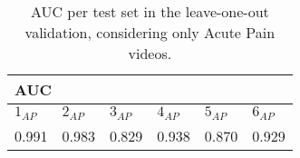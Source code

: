 \begin{table}[h!tp]
\centering
\caption{AUC per test set in the leave-one-out validation, considering only Acute Pain videos.}
\label{tab:auc_leave_one_out}
\begin{tabular}{llllll}
\hline
\multicolumn{6}{l}{AUC} \\ \hline
\multicolumn{1}{l|}{$1_{AP}$}    & \multicolumn{1}{l|}{$2_{AP}$}    & \multicolumn{1}{l|}{$3_{AP}$}    & \multicolumn{1}{l|}{$4_{AP}$}    & \multicolumn{1}{l|}{$5_{AP}$}    & $6_{AP}$   \\ \hline
\multicolumn{1}{l|}{0.991} & \multicolumn{1}{l|}{0.983} & \multicolumn{1}{l|}{0.829} & \multicolumn{1}{l|}{0.938} & \multicolumn{1}{l|}{0.870} & 0.929 \\ \hline
\end{tabular}
\end{table}